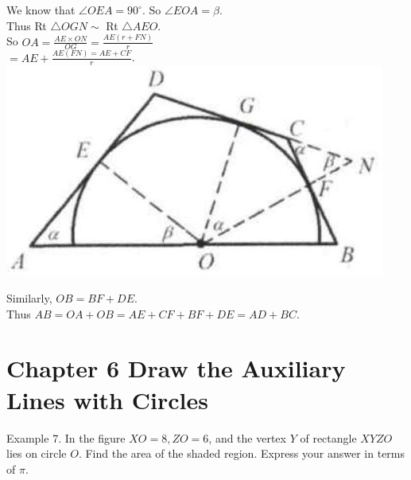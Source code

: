 \documentclass[10pt]{article}
\begin{document}
We know that \(\angle O E A=90^{\circ}\). So \(\angle E O A=\beta\).\\
Thus Rt \(\triangle O G N \sim\) Rt \(\triangle A E O\).\\
So \(O A=\frac{A E \times O N}{O G}=\frac{A E(r+F N)}{r}\)\\
\(=A E+\frac{A E(F N)=A E+C F}{r}\).\\
\includegraphics[max width=\textwidth, center]{2025_04_17_97bc1f7e44d93c271a88g-149(1)}

Similarly, \(O B=B F+D E\).\\
Thus \(A B=O A+O B=A E+C F+B F+D E=A D+B C\).

\section*{Chapter 6 Draw the Auxiliary Lines with Circles}
Example 7. In the figure \(X O=8, Z O=6\), and the vertex \(Y\) of rectangle \(X Y Z O\) lies on circle \(O\). Find the area of the shaded region. Express your answer in terms of \(\pi\).
\end{document}

